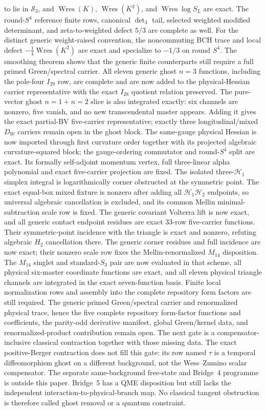 \documentclass[11pt]{article}
\theoremstyle{definition}
\theoremstyle{remark}
\begin{document}
to lie in $\mathcal S_3$, and
$\operatorname{Wres}(K)$, $\operatorname{Wres}(K^2)$, and
$\operatorname{Wres}\log S_L$ are exact.  The round-$S^4$ reference finite
rows, canonical $\det_3$ tail, selected weighted modified determinant, and
zeta-to-weighted defect $5/3$ are complete as well.  For the distinct generic
weight-raised convention, the noncommuting BCH trace and local defect
$-\tfrac14\operatorname{Wres}(K^2)$ are exact and specialize to $-1/3$ on
round $S^4$.  The smoothing theorem shows that the generic finite counterparts
still require a full primed Green/spectral carrier.  All eleven generic
  ghost $n=3$ functions, including the pole-four $I_{29}$ row, are complete and
are now added to the physical-Hessian carrier representative with the exact
$I_{28}$ quotient relation preserved.  The pure-vector ghost $n=1+n=2$ slice
is also integrated exactly: six channels are nonzero, five vanish, and no new
transcendental master appears.  Adding it gives the exact partial-BV
five-carrier representative; exactly three longitudinal/mixed $D_W$ carriers
remain open in the ghost block.
The same-gauge physical Hessian is now imported through first curvature
order together with its projected algebraic curvature-squared block; the
gauge-ordering commutator and round-$S^4$ split are exact.  Its formally
self-adjoint momentum vertex, full three-linear alpha polynomial and exact
five-carrier projection are fixed.  The isolated three-$\mathcal H_1$
simplex integral is logarithmically corner obstructed at the symmetric point.
The exact equal-box mixed fixture is nonzero after adding all
$\mathcal H_1\mathcal H_2$ endpoints, so universal algebraic cancellation is
excluded, and its common Mellin minimal-subtraction scale row is fixed.  The
generic covariant Volterra lift is now exact, and all generic contact endpoint
residues are exact 33-row five-carrier functions.  Their symmetric-point
incidence with the triangle is exact and nonzero, refuting algebraic $H_2$
cancellation there.  The generic corner residues and full incidence are now
exact; their nonzero scale row fixes the Mellin-renormalized $M_{14}$
disposition.  The $M_{14}$ singlet and standard-$S_3$ pair are now evaluated
in that scheme, all physical six-master coordinate functions are exact, and
all eleven physical triangle channels are integrated in the exact
seven-function basis.  Finite local normalization rows and assembly into the
complete repository form factors are still required.  The generic primed
Green/spectral carrier and renormalized physical trace, hence the
five complete repository form-factor functions and
coefficients, the parity-odd derivative manifest, global Green/kernel data, and
renormalized-product contribution remain open.  The next gate is a
compensator-inclusive classical contraction together with those missing data.
The exact positive-Berger contraction does not fill this gate: its row named
$\tau$ is a temporal diffeomorphism ghost on a different background, not the
Wess--Zumino scalar compensator.
The separate same-background free-state and Bridge~4 programme is outside
this paper.  Bridge~5 has a QME disposition but still lacks the independent
interaction-to-physical-branch map.  No classical tangent obstruction is
therefore called ghost removal or a quantum constraint.
\end{document}
